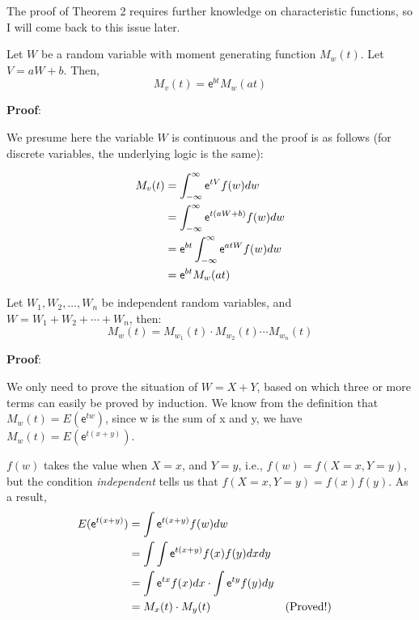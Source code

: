 \documentclass[12pt]{article}
\begin{document}
The proof of Theorem 2 requires further knowledge on characteristic functions,  so I will come back to this issue later.\\


\begin{tcolorbox} [colback=blue!5!white,  colframe=blue!75!black,  title= {\textbf{Theorem 3a} }]

\hspace{10pt} Let $W$ be a random variable with moment generating function $M_w (t)$.  Let $V=aW + b$.  Then, 
$$ M_v (t) = \mathsf{e}^{bt} M_w (at) $$

\end{tcolorbox}

\textbf{Proof}:

We presume here the variable $W$ is continuous and the proof is as follows (for discrete variables,  the underlying logic is the same):

$$
\begin{aligned}[t]
M_v (t) 
	&= \int_{-\infty} ^{\infty} \mathsf{e}^{tV} f(w)dw \\
	&= \int_{-\infty} ^{\infty} \mathsf{e}^{t(aW + b)} f(w)dw \\
	&= \mathsf{e}^{bt} \int_{-\infty} ^{\infty} \mathsf{e}^{atW} f(w)dw \\
	&= \mathsf{e}^{bt} M_w (at) \\
\end{aligned}\\
$$


\begin{tcolorbox} [colback=blue!5!white,  colframe=blue!75!black,  title= {\textbf{Theorem 3b} }]

\hspace{10pt} Let $W_1,  W_2,  \dots ,  W_n$ be independent random variables,  and $W = W_1 + W_2 + \cdots + W_n$,  then: 
$$
M_w (t) = M_{w_1} (t) \cdot M_{w_2} (t) \cdots M_{w_n} (t) 
$$
\end{tcolorbox}


\textbf{Proof}:

We only need to prove the situation of $W=X+Y$,  based on which three or more terms can easily be proved by induction.  We know from the definition that $M_w (t) = E(\mathsf{e}^{tw} ) $,  since w is the sum of x and y,  we have $M_w (t) = E(\mathsf{e}^{t(x+y)})$.  

$f(w)$ takes the value when $X=x$,  and $Y=y$,  i.e.,  $f(w) = f(X=x,  Y=y)$,  but the condition \textit{independent} tells us that $f(X=x,  Y=y) = f(x)f(y)$.  As a result, 
$$
\begin{aligned}[t]
E(\mathsf{e}^{t(x+y)})
	&= \int \mathsf{e}^{t(x+y)}f(w)dw \\
	&= \int \int \mathsf{e}^{t(x+ y)} f(x)f(y)dxdy \\
	&= \int \mathsf{e}^{tx} f(x)dx \cdot \int \mathsf{e}^{ty} f(y)dy\\
	&= M_x (t) \cdot M_y (t) && {\text{(Proved!)} }\\
\end{aligned}\\
$$





\vspace{20pt}






\printbibliography[title={Reference}]


\end{document}
